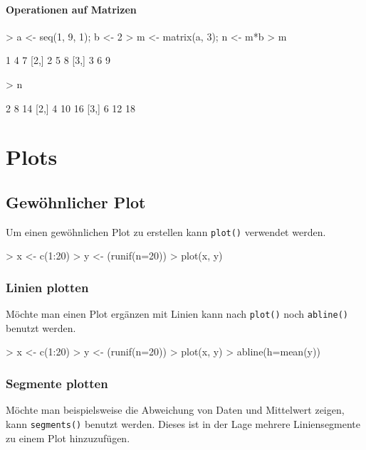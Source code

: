 \paragraph{Operationen auf Matrizen}
\begin{Schunk}
\begin{Sinput}
> a <- seq(1, 9, 1); b <- 2
> m <- matrix(a, 3); n <- m*b
> m
\end{Sinput}
\begin{Soutput}
     [,1] [,2] [,3]
[1,]    1    4    7
[2,]    2    5    8
[3,]    3    6    9
\end{Soutput}
\begin{Sinput}
> n
\end{Sinput}
\begin{Soutput}
     [,1] [,2] [,3]
[1,]    2    8   14
[2,]    4   10   16
[3,]    6   12   18
\end{Soutput}
\end{Schunk}

\section{Plots}\label{sec:plots}

\subsection{Gewöhnlicher Plot}
Um einen gewöhnlichen Plot zu erstellen kann \lstinline{plot()}
verwendet werden. 

\begin{Schunk}
\begin{Sinput}
> x <- c(1:20)
> y <- (runif(n=20))
> plot(x, y)
\end{Sinput}
\end{Schunk}

\subsubsection{Linien plotten}
Möchte man einen Plot ergänzen mit Linien kann nach \lstinline{plot()}
noch \lstinline{abline()} benutzt werden.

\begin{Schunk}
\begin{Sinput}
> x <- c(1:20)
> y <- (runif(n=20))
> plot(x, y)
> abline(h=mean(y))
\end{Sinput}
\end{Schunk}

\subsubsection{Segmente plotten}
Möchte man beispielsweise die Abweichung von Daten und Mittelwert
zeigen, kann \lstinline{segments()} benutzt werden. Dieses ist in der
Lage mehrere Liniensegmente zu einem Plot hinzuzufügen.


